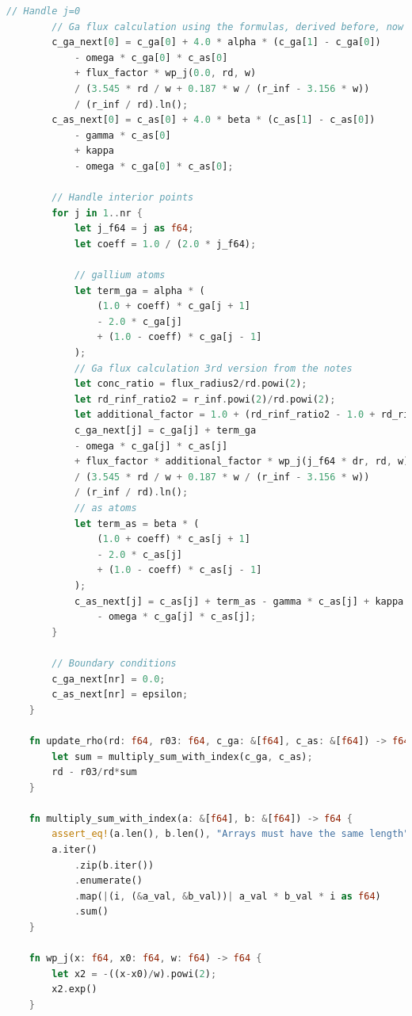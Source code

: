 \documentclass[14pt,oneside]{extarticle}
\begin{document}
\begin{lstlisting}[language=Rust]
        // Handle j=0
        // Ga flux calculation using the formulas, derived before, now gives a correct result
        c_ga_next[0] = c_ga[0] + 4.0 * alpha * (c_ga[1] - c_ga[0])
            - omega * c_ga[0] * c_as[0]
            + flux_factor * wp_j(0.0, rd, w)
            / (3.545 * rd / w + 0.187 * w / (r_inf - 3.156 * w))
            / (r_inf / rd).ln();
        c_as_next[0] = c_as[0] + 4.0 * beta * (c_as[1] - c_as[0]) 
            - gamma * c_as[0] 
            + kappa 
            - omega * c_ga[0] * c_as[0];
    
        // Handle interior points
        for j in 1..nr {
            let j_f64 = j as f64;
            let coeff = 1.0 / (2.0 * j_f64);
            
            // gallium atoms
            let term_ga = alpha * (
                (1.0 + coeff) * c_ga[j + 1] 
                - 2.0 * c_ga[j] 
                + (1.0 - coeff) * c_ga[j - 1]
            );
            // Ga flux calculation 3rd version from the notes
            let conc_ratio = flux_radius2/rd.powi(2);
            let rd_rinf_ratio2 = r_inf.powi(2)/rd.powi(2);
            let additional_factor = 1.0 + (rd_rinf_ratio2 - 1.0 + rd_rinf_ratio2.ln())/conc_ratio;
            c_ga_next[j] = c_ga[j] + term_ga
            - omega * c_ga[j] * c_as[j]
            + flux_factor * additional_factor * wp_j(j_f64 * dr, rd, w)
            / (3.545 * rd / w + 0.187 * w / (r_inf - 3.156 * w))
            / (r_inf / rd).ln();
            // as atoms
            let term_as = beta * (
                (1.0 + coeff) * c_as[j + 1] 
                - 2.0 * c_as[j] 
                + (1.0 - coeff) * c_as[j - 1]
            );
            c_as_next[j] = c_as[j] + term_as - gamma * c_as[j] + kappa 
                - omega * c_ga[j] * c_as[j];
        }
    
        // Boundary conditions
        c_ga_next[nr] = 0.0;
        c_as_next[nr] = epsilon;
    }
    
    fn update_rho(rd: f64, r03: f64, c_ga: &[f64], c_as: &[f64]) -> f64 {
        let sum = multiply_sum_with_index(c_ga, c_as);
        rd - r03/rd*sum
    }
    
    fn multiply_sum_with_index(a: &[f64], b: &[f64]) -> f64 {
        assert_eq!(a.len(), b.len(), "Arrays must have the same length");
        a.iter()
            .zip(b.iter())
            .enumerate()
            .map(|(i, (&a_val, &b_val))| a_val * b_val * i as f64)
            .sum()
    }
    
    fn wp_j(x: f64, x0: f64, w: f64) -> f64 {
        let x2 = -((x-x0)/w).powi(2);
        x2.exp()
    } 
\end{lstlisting}
\end{document}
